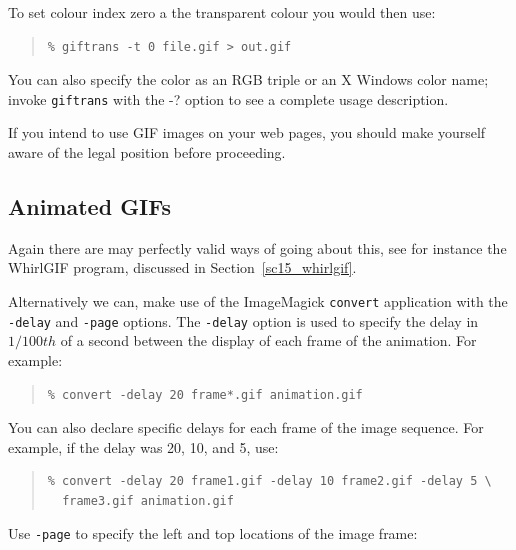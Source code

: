 \documentclass[twoside,11pt]{article}
\newcommand{\htmlref}[2]{#1}
\newcommand{\latex}[1]{#1}
\newcommand{\xlabel}[1]{}
\begin{document}
To set colour index zero a the transparent colour you would then use:

\small
\begin{quote}
\begin{verbatim}
% giftrans -t 0 file.gif > out.gif
\end{verbatim}
\end{quote}
\normalsize

You can also specify the color as an RGB triple or an X Windows color name; invoke {\tt giftrans} with the -? option to see a complete usage description. 

If you intend to use GIF images on your web pages, you should make yourself aware of the \htmlref{legal position}{sc15_giflegal} before proceeding. 

\subsection{\xlabel{sc15_animated}Animated GIFs\label{sc15_animated}}

Again there are may perfectly valid ways of going about this, see for instance the \htmlref{WhirlGIF}{sc15_whirlgif} program\latex{, discussed in Section~\ref{sc15_whirlgif}}.

Alternatively we can, make use of the \htmlref{ImageMagick}{sc15_magick} {\tt convert} application with the {\tt -delay} and {\tt -page} options. The {\tt -delay} option is used to specify the delay in $1/100 th$  of a second between the display of each frame of the animation. For example:

\small
\begin{quote}
\begin{verbatim}
% convert -delay 20 frame*.gif animation.gif
\end{verbatim}
\end{quote}
\normalsize

You can also declare specific delays for each frame of the image sequence. For example, if the delay was 20, 10, and 5, use:

\small
\begin{quote}
\begin{verbatim}
% convert -delay 20 frame1.gif -delay 10 frame2.gif -delay 5 \
  frame3.gif animation.gif
\end{verbatim}
\end{quote}
\normalsize

Use {\tt -page} to specify the left and top locations of the image frame: 
\end{document}
